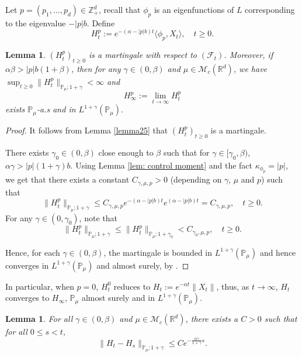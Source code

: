 \documentclass[12pt]{amsart}
\theoremstyle{plain}
\newtheorem{lem}[thm]{Lemma}
\theoremstyle{definition}
\numberwithin{equation}{section}
\begin{document}
    Let $p=(p_1,...,p_d)\in \mathbb Z_+^d$, recall that $\phi_p$ is an eigenfunctions of $L$ corresponding to the eigenvalue $-|p|b$. Define
\[
    H_t^p
    :=e^{-(\alpha-|p|b)t}\langle\phi_p,X_t\rangle, \quad t\geq 0.
\]

\begin{lem}\label{lemma26}
    $(H^p_t)_{t\geq 0}$ is a martingale with respect to $(\mathscr F_t)$.
    Moreover, if $\alpha\beta>|p|b(1+\beta)$, then for any $\gamma\in (0, \beta)$ and $\mu \in \mathcal M_c(\mathbb R^d)$, we have $\sup_{t\geq 0}\|H_t^p\|_{\mathbb P_\mu;1+\gamma}< \infty$ and
\[
    H_{\infty}^p
    :=\lim_{t\rightarrow \infty}H_t^p
\]
exists $\mathbb{P}_{\mu}$-a.s and in $L^{1+\gamma}(\mathbb{P}_{\mu}).$
\end{lem}
\begin{proof}
   It follows from Lemma \ref{lemma25} that $(H_t^p)_{t\geq 0}$ is a martingale.

    There exists $\gamma_0 \in (0,\beta)$ close enough to $\beta$ such that for $\gamma\in [\gamma_0, \beta)$, $\alpha\gamma>|p|(1+\gamma)b$.
    Using  Lemma \ref{lem: control moment} and the fact $\kappa_{\phi_p}=|p|$, we get that there exists a constant $C_{\gamma, \mu, p}>0$ (depending on $\gamma$, $\mu$ and $p$)  such that
\[
 	\|H_t^p\|_{\mathbb P_\mu;1+\gamma}
    \leq C_{\gamma, \mu, p} e^{-(\alpha-|p|b)t}e^{(\alpha-|p|b)t}
    =C_{\gamma, \mu, p}, \quad t\geq 0.
\]
    For any $\gamma\in (0, \gamma_0)$, note that
\[
	\|H_t^p\|_{\mathbb P_\mu;1+\gamma}
	\leq\|H_t^p\|_{\mathbb P_\mu;1+\gamma_0}
	<C_{\gamma_0, \mu, p},
	\quad t\geq 0.
\]

    Hence, for each $\gamma \in (0,\beta)$, the martingale is bounded in $L^{1+\gamma}(\mathbb{P}_{\mu})$ and hence converges in $L^{1+\gamma}(\mathbb{P}_{\mu}) $ and almost surely, by \cite[Theorem 5.4.5]{Durrett2010Probability}.
\end{proof}

In particular, when $p=0$, $H_t^0$ reduces to $H_t:=e^{-\alpha t}\|X_t\|$, thus, as $t\rightarrow \infty$, $H_t$ converges to $H_{\infty}$, $\mathbb{P}_{\mu}$ almost surely and in $L^{1+\gamma}(\mathbb{P}_{\mu})$.

\begin{lem}\label{lem: control of Wt}
 For all $\gamma\in (0,\beta)$ and $\mu\in \mathcal M_c(\mathbb R^d)$, there exists a $C> 0$ such that for all $0\leq s<t$,
\[
    \|H_t-H_s\|_{\mathbb{P}_{\mu};1+\gamma}
    \leq C e^{-\frac{\alpha \gamma}{1+\gamma}s}.
\]
\end{lem}
\end{document}
